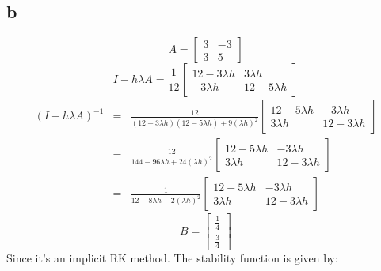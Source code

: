\documentclass[11pt]{article}
\begin{document}
\subsection*{b}
\[A = \begin{bmatrix}
3 & -3 \\
3 & 5
\end{bmatrix} 
\]
\[I - h \lambda A = \frac{1}{12} \begin{bmatrix}
12 - 3 \lambda h & 3 \lambda h \\
- 3 \lambda h & 12 - 5 \lambda h
\end{bmatrix}
\]
\begin{eqnarray*}
(I - h \lambda A)^{-1} &=& \frac{12}{(12 - 3 \lambda h)(12 - 5 \lambda h) + 9 (\lambda h)^2} \begin{bmatrix}
12 - 5 \lambda h & - 3 \lambda h \\
3 \lambda h & 12 - 3 \lambda h
\end{bmatrix} \\
&=& \frac{12}{144 - 96 \lambda h + 24 (\lambda h)^2} \begin{bmatrix}
12 - 5 \lambda h & - 3 \lambda h \\
3 \lambda h & 12 - 3 \lambda h
\end{bmatrix} \\
&=& \frac{1}{12 - 8 \lambda h + 2 (\lambda h)^2} \begin{bmatrix}
12 - 5 \lambda h & - 3 \lambda h \\
3 \lambda h & 12 - 3 \lambda h
\end{bmatrix}
\end{eqnarray*}
\[B = \begin{bmatrix}
\frac{1}{4} \\
\frac{3}{4}
\end{bmatrix} \]
Since it's an implicit RK method. The stability function is given by:
\end{document}
